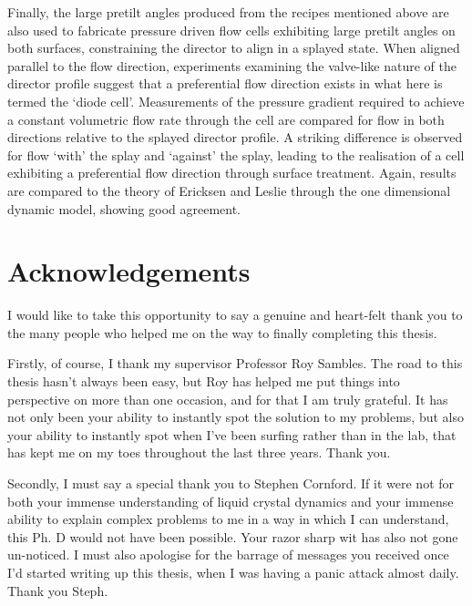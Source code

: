 Finally, the large pretilt angles produced from the recipes mentioned above are also used to fabricate pressure driven flow cells exhibiting large pretilt angles on both surfaces, constraining the director to align in a splayed state. When aligned parallel to the flow direction, experiments examining the valve-like nature of the director profile suggest that a preferential flow direction exists in what here is termed the `diode cell'. Measurements of the pressure gradient required to achieve a constant volumetric flow rate through the cell are compared for flow in both directions relative to the splayed director profile. A striking difference is observed for flow `with' the splay and `against' the splay, leading to the realisation of a cell exhibiting a preferential flow direction through surface treatment. Again, results are compared to the theory of Ericksen and Leslie through the one dimensional dynamic model, showing good agreement.



\newpage
\tableofcontents*
\listoffigures
\listoftables

\chapter*{Acknowledgements}
I would like to take this opportunity to say a genuine and heart-felt thank you to the many people who helped me on the way to finally completing this thesis.

Firstly, of course, I thank my supervisor Professor Roy Sambles. The road to this thesis hasn't always been easy, but Roy has helped me put things into perspective on more than one occasion, and for that I am truly grateful. It has not only been your ability to instantly spot the solution to my problems, but also your ability to instantly spot when I've been surfing rather than in the lab, that has kept me on my toes throughout the last three years. Thank you.

Secondly, I must say a special thank you to Stephen Cornford. If it were not for both your immense understanding of liquid crystal dynamics and your immense ability to explain complex problems to me in a way in which I can understand, this Ph. D would not have been possible. Your razor sharp wit has also not gone un-noticed. I must also apologise for the barrage of messages you received once I'd started writing up this thesis, when I was having a panic attack almost daily. Thank you Steph.

